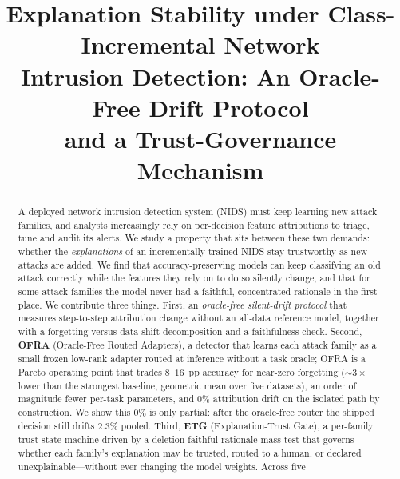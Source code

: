 \documentclass[conference]{IEEEtran}
\begin{document}
\title{Explanation Stability under Class-Incremental Network\\
Intrusion Detection: An Oracle-Free Drift Protocol\\
and a Trust-Governance Mechanism}

\author{
}

\maketitle

\begin{abstract}
A deployed network intrusion detection system (NIDS) must keep learning new
attack families, and analysts increasingly rely on per-decision feature
attributions to triage, tune and audit its alerts. We study a property that
sits between these two demands: whether the \emph{explanations} of an
incrementally-trained NIDS stay trustworthy as new attacks are added. We find
that accuracy-preserving models can keep classifying an old attack correctly
while the features they rely on to do so silently change, and that for some
attack families the model never had a faithful, concentrated rationale in the
first place. We contribute three things. First, an \emph{oracle-free
silent-drift protocol} that measures step-to-step attribution change without an
all-data reference model, together with a forgetting-versus-data-shift
decomposition and a faithfulness check. Second, \textbf{OFRA} (Oracle-Free
Routed Adapters), a detector that learns each attack family as a small frozen
low-rank adapter routed at inference without a task oracle; OFRA is a Pareto
operating point that trades $8$--$16$~pp accuracy for near-zero forgetting
($\sim\!3\times$ lower than the strongest baseline, geometric mean over five
datasets), an order of magnitude fewer per-task parameters, and $0\%$
attribution drift on the isolated path by construction. We show this $0\%$ is
only partial: after the oracle-free router the shipped decision still drifts
$2.3\%$ pooled. Third, \textbf{ETG} (Explanation-Trust Gate), a per-family
trust state machine driven by a deletion-faithful rationale-mass test that
governs whether each family's explanation may be trusted, routed to a human, or
declared unexplainable---without ever changing the model weights. Across five

\end{abstract}
\end{document}
